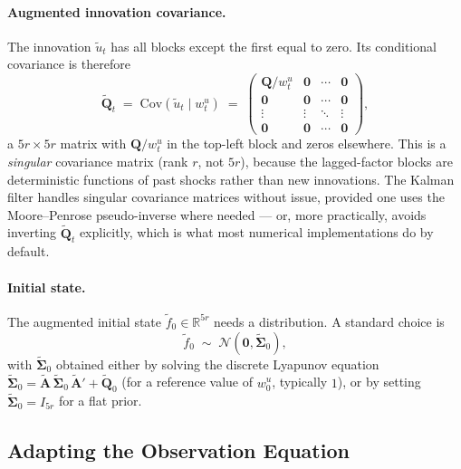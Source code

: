 \documentclass[11pt, a4paper, oneside]{article}
\newcommand{\mA}{\mathbf{A}}
\newcommand{\mQ}{\mathbf{Q}}
\begin{document}
\paragraph{Augmented innovation covariance.}
The innovation $\tilde{u}_t$ has all blocks except the first equal to
zero. Its conditional covariance is therefore
\begin{equation}
\tilde{\mQ}_t \;=\; \mathrm{Cov}(\tilde{u}_t \mid w^u_t) \;=\; \begin{pmatrix}
\mQ/w^u_t & \mathbf{0} & \cdots & \mathbf{0} \\
\mathbf{0} & \mathbf{0} & \cdots & \mathbf{0} \\
\vdots & \vdots & \ddots & \vdots \\
\mathbf{0} & \mathbf{0} & \cdots & \mathbf{0}
\end{pmatrix},
\label{eq:mm-augmented-Q}
\end{equation}
a $5r \times 5r$ matrix with $\mQ/w^u_t$ in the top-left block and
zeros elsewhere. This is a \emph{singular} covariance matrix (rank
$r$, not $5r$), because the lagged-factor blocks are deterministic
functions of past shocks rather than new innovations. The Kalman
filter handles singular covariance matrices without issue, provided
one uses the Moore–Penrose pseudo-inverse where needed — or, more
practically, avoids inverting $\tilde{\mQ}_t$ explicitly, which is
what most numerical implementations do by default.

\paragraph{Initial state.}
The augmented initial state $\tilde{f}_0 \in \mathbb{R}^{5r}$ needs a
distribution. A standard choice is
\[
\tilde{f}_0 \;\sim\; \mathcal{N}(\mathbf{0}, \tilde{\boldsymbol{\Sigma}}_0),
\]
with $\tilde{\boldsymbol{\Sigma}}_0$ obtained either by solving the
discrete Lyapunov equation
$\tilde{\boldsymbol{\Sigma}}_0 = \tilde{\mA}\, \tilde{\boldsymbol{\Sigma}}_0\, \tilde{\mA}' + \tilde{\mQ}_0$
(for a reference value of $w^u_0$, typically $1$), or by setting
$\tilde{\boldsymbol{\Sigma}}_0 = I_{5r}$ for a flat prior.

\subsection{Adapting the Observation Equation}
\label{subsec:mm-observation}
\end{document}
